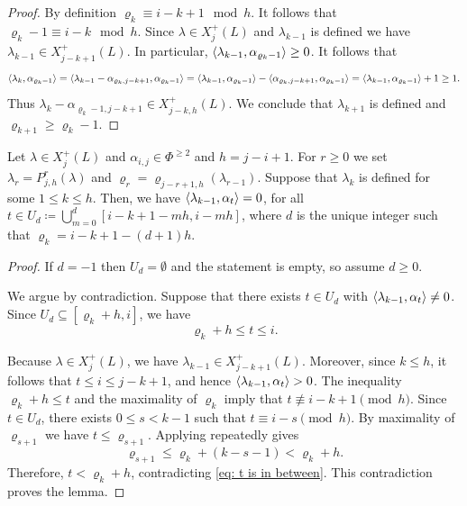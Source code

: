 \begin{proof}
By definition $\varrho_k\equiv i-k +1  \mod h $. 
It follows that $\varrho_k -1\equiv i-k   \mod h $.
Since $\lambda \in X_j^+(L) $  and $\lambda_{k-1} $ is defined we have $\lambda_{k-1} \in X^{+}_{j-k+1}(L)$. 
In particular, $\langle \lambda_{k-1} , \alpha_{\varrho_k-1} \rangle\geq 0$. It follows that
\begin{equation}
    \langle \lambda_{k} , \alpha_{\varrho_k-1} \rangle = \langle \lambda_{k-1}-\alpha_{\varrho_k,j-k+1} , \alpha_{\varrho_k-1} \rangle = \langle \lambda_{k-1} , \alpha_{\varrho_k-1} \rangle -\langle \alpha_{\varrho_k,j-k+1} , \alpha_{\varrho_k-1} \rangle = \langle \lambda_{k-1} , \alpha_{\varrho_k-1} \rangle +1 \geq 1. 
\end{equation}
Thus  $\lambda_k - \alpha_{\varrho_k-1, j-k+1}\in X^+_{j-k,h}(L) $. 
We conclude that  $\lambda_{k+1}$ is defined and $\varrho_{k+1} \geq \varrho_{k} - 1$.
\end{proof}


\begin{corollary} \label{lem: ceros por Ps}
 Let $\lambda \in X^+_{j}(L)$ and $\alpha_{i,j}\in \Phi^{\geq 2}$ and $h=j-i+1$.
 For $r\geq 0$ we set $\lambda_{r} = P^r_{j,h}   (\lambda) $ and  $\varrho_{r}=\varrho_{j-r+1,h}(\lambda_{r-1})  $.
    Suppose that  $\lambda_{k}$ is defined for some  $1\leq k \leq h$. 
    Then, we have
    $\langle \lambda_{k-1} , \alpha_{t} \rangle = 0$,
    for all $\displaystyle  t\in U_d\coloneqq \bigcup_{m=0}^{d} [i-k+1-mh,i-mh]$, where $d$ is the unique integer such that $\varrho_k = i-k+1 -(d+1)h$.
\end{corollary}

\begin{proof}
If $d=-1$ then $U_d=\emptyset$ and the statement is empty, so assume $d\geq 0$.

We argue by contradiction. Suppose that there exists $t\in U_d$ with 
$\langle \lambda_{k-1} , \alpha_t \rangle\neq 0$.
Since $U_d\subseteq [\varrho_k+h,i]$, we have
\begin{equation} \label{eq: t is in  between}
    \varrho_k+h \le t \le i.
\end{equation}

Because $\lambda\in X_j^+(L)$, we have $\lambda_{k-1} \in X_{j-k+1}^+(L)$.  
Moreover, since $k\le h$, it follows that $t\le i\le j-k+1$, and hence
$\langle \lambda_{k-1} , \alpha_t \rangle>0$.
The inequality $\varrho_k+h \le t$ and the maximality of $\varrho_k$ imply that 
$t\not\equiv i-k+1 \pmod{h}$.  
Since $t\in U_d$, there exists $0\le s<k-1$ such that 
$t\equiv i-s \pmod{h}$.
By maximality of $\varrho_{s+1}$ we have $t\le \varrho_{s+1}$.
Applying  repeatedly gives
\begin{equation}
    \varrho_{s+1} \le \varrho_k + (k-s-1) < \varrho_k + h.
\end{equation}
Therefore,
    $t < \varrho_k + h$,
contradicting \eqref{eq: t is in  between}.
This contradiction proves the lemma.
\end{proof}

